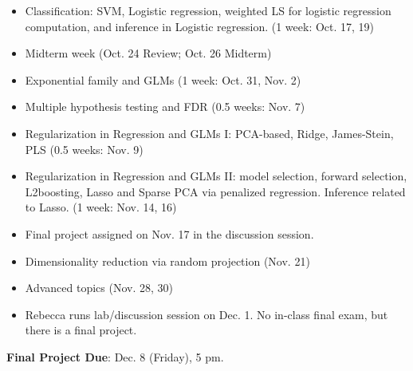 \documentclass[11pt]{article}
\begin{document}
\begin{itemize}
\item 
Classification: SVM, Logistic regression, weighted LS for logistic regression
computation, and inference in Logistic regression. (1 week: Oct. 17, 19)

\item Midterm week (Oct. 24 Review; Oct. 26 Midterm)

\item Exponential family and GLMs (1 week: Oct. 31, Nov. 2)

\item Multiple hypothesis testing and FDR (0.5 weeks: Nov. 7)

\item Regularization in Regression and GLMs I: PCA-based, Ridge, James-Stein, 
PLS (0.5 weeks: Nov. 9)

\item
Regularization in Regression and GLMs II: model selection, forward selection, L2boosting, Lasso and Sparse PCA via penalized regression. Inference related
to Lasso.  (1 week: Nov. 14, 16)

\item Final project assigned on Nov. 17 in the discussion session.

\item Dimensionality reduction via random projection (Nov. 21) 

\item Advanced topics (Nov. 28, 30)

\item 
Rebecca runs lab/discussion session on Dec. 1. No in-class final exam, but there is a final project.
\end{itemize}

{\bf Final Project Due}: Dec. 8 (Friday), 5 pm.
\end{document}
